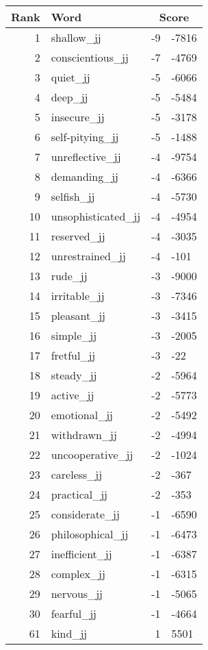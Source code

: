 \begin{longtable}[!htbp]{| rlr@{.}l |}
    \hline
    \textbf{Rank} & \textbf{Word} & \multicolumn{2}{c|}{\textbf{Score}} \\
    \hline
    \endhead
    1 & shallow\_jj & -9 & -7816 \\
    2 & conscientious\_jj & -7 & -4769 \\
    3 & quiet\_jj & -5 & -6066 \\
    4 & deep\_jj & -5 & -5484 \\
    5 & insecure\_jj & -5 & -3178 \\
    6 & self-pitying\_jj & -5 & -1488 \\
    7 & unreflective\_jj & -4 & -9754 \\
    8 & demanding\_jj & -4 & -6366 \\
    9 & selfish\_jj & -4 & -5730 \\
    10 & unsophisticated\_jj & -4 & -4954 \\
    11 & reserved\_jj & -4 & -3035 \\
    12 & unrestrained\_jj & -4 & -101 \\
    13 & rude\_jj & -3 & -9000 \\
    14 & irritable\_jj & -3 & -7346 \\
    15 & pleasant\_jj & -3 & -3415 \\
    16 & simple\_jj & -3 & -2005 \\
    17 & fretful\_jj & -3 & -22 \\
    18 & steady\_jj & -2 & -5964 \\
    19 & active\_jj & -2 & -5773 \\
    20 & emotional\_jj & -2 & -5492 \\
    21 & withdrawn\_jj & -2 & -4994 \\
    22 & uncooperative\_jj & -2 & -1024 \\
    23 & careless\_jj & -2 & -367 \\
    24 & practical\_jj & -2 & -353 \\
    25 & considerate\_jj & -1 & -6590 \\
    26 & philosophical\_jj & -1 & -6473 \\
    27 & inefficient\_jj & -1 & -6387 \\
    28 & complex\_jj & -1 & -6315 \\
    29 & nervous\_jj & -1 & -5065 \\
    30 & fearful\_jj & -1 & -4664 \\
    61 & kind\_jj & 1 & 5501 \\

\end{longtable}
